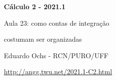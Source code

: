 \documentclass[oneside,12pt]{article}
\begin{document}


%
%

\def\pfo#1{\ensuremath{\mathsf{[#1]}}}

\def\drafturl{http://angg.twu.net/LATEX/2021-1-C2.pdf}
\def\drafturl{http://angg.twu.net/2021.1-C2.html}
\def\draftfooter{\tiny \href{\drafturl}{\jobname{}} \ColorBrown{\shorttoday{} \hours}}



%

\thispagestyle{empty}

\begin{center}

\vspace*{1.2cm}

{\bf \Large Cálculo 2 - 2021.1}

\bsk

Aula 23: como contas de integração

costumam ser organizadas

\bsk

Eduardo Ochs - RCN/PURO/UFF

\url{http://angg.twu.net/2021.1-C2.html}

\end{center}
\end{document}
